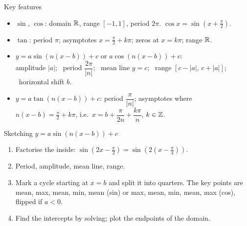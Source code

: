 \begin{cols}
\nextcol
\begin{keyres}{Key features}
\begin{itemize}
  \item $\sin$, $\cos$: domain $\mathbb{R}$, range $[-1,1]$, period $2\pi$. $\cos x=\sin\!\left(x+\frac{\pi}{2}\right)$.
  \item $\tan$: period $\pi$; asymptotes $x=\frac{\pi}{2}+k\pi$; zeros at $x=k\pi$; range $\mathbb{R}$.
  \item $y=a\sin(n(x-b))+c$ or $a\cos(n(x-b))+c$:\\
   amplitude $|a|$; \ period $\dfrac{2\pi}{|n|}$; \ mean line $y=c$; \ range $[c-|a|,\,c+|a|]$; \ horizontal shift $b$.
  \item $y=a\tan(n(x-b))+c$: period $\dfrac{\pi}{|n|}$; asymptotes where $n(x-b)=\frac{\pi}{2}+k\pi$, i.e.\ $x=b+\dfrac{\pi}{2n}+\dfrac{k\pi}{n}$, $k\in\mathbb{Z}$.
\end{itemize}
\end{keyres}
\begin{method}{Sketching $y=a\sin(n(x-b))+c$ \byhand}
\begin{enumerate}
  \item Factorise the inside: $\sin(2x-\frac{\pi}{2})=\sin\!\left(2\left(x-\frac{\pi}{4}\right)\right)$.
  \item Period, amplitude, mean line, range.
  \item Mark a cycle starting at $x=b$ and split it into quarters. The key points are mean, max, mean, min, mean (sin) or max, mean, min, mean, max (cos), flipped if $a<0$.
  \item Find the intercepts by solving; plot the endpoints of the domain.
\end{enumerate}
\end{method}
\end{cols}

